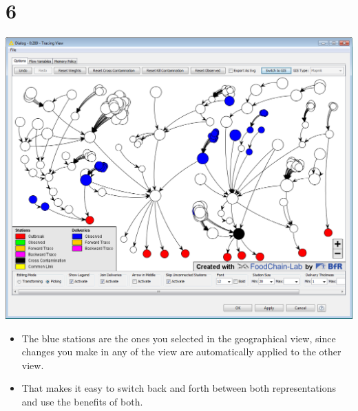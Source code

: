 \documentclass{beamer}
\begin{document}
\section{6}
\begin{frame}
	\begin{center}
  		\includegraphics[height=0.6\textheight]{6.png}
	\end{center}
	\begin{itemize}
		\item The blue stations are the ones you selected in the geographical view, since changes you make in any of the view are automatically applied to the other view.
		\item That makes it easy to switch back and forth between both representations and use the benefits of both.
	\end{itemize}
\end{frame}
\end{document}
